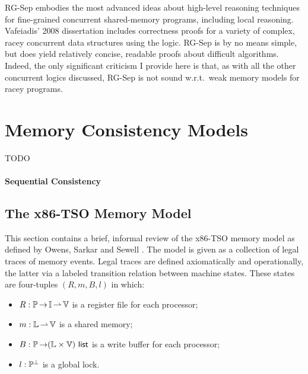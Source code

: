 \documentclass[11pt]{article}
\begin{document}
RG-Sep embodies the most advanced ideas about high-level reasoning techniques for fine-grained concurrent shared-memory programs, including local reasoning. Vafeiadis' 2008 dissertation \cite{VafeiadisDissertation} includes correctness proofs for a variety of complex, racey concurrent data structures using the logic. RG-Sep is by no means simple, but does yield relatively concise, readable proofs about difficult algorithms. Indeed, the only significant criticism I provide here is that, as with all the other concurrent logics discussed, RG-Sep is not sound w.r.t.~weak memory models for racey programs.

\section{Memory Consistency Models}

TODO 

\paragraph{Sequential Consistency} 

\subsection{The x86-TSO Memory Model}
\label{sec:memory-model}

This section contains a brief, informal review of the x86-TSO memory model as defined by Owens, Sarkar and Sewell \cite{DBLP:conf/tphol/OwensSS09}. The model is given as a collection of legal traces of memory events. Legal traces are defined axiomatically and operationally, the latter via a labeled transition relation between machine states. These states are four-tuples $(R,m,B,l)$ in which: \begin{itemize}
	\item $R : \mathbb{P} \operatorname{\rightarrow} \mathbb{I} \operatorname{\rightharpoonup} \mathbb{V}$ is a register file for each processor;
	\item $m : \mathbb{L} \operatorname{\rightharpoonup} \mathbb{V}$ is a shared memory; 
	\item $B : \mathbb{P} \operatorname{\rightarrow} (\mathbb{L} \times \mathbb{V})~\mathsf{list}$ is a write buffer for each processor; 
	\item $l : \mathbb{P}^\bot$ is a global lock. 
\end{itemize}
\end{document}
